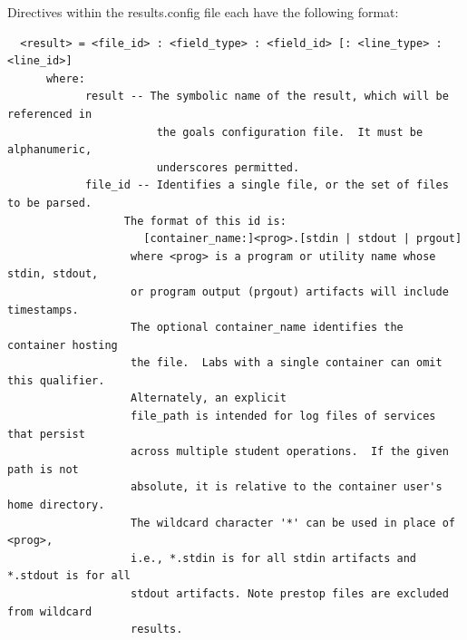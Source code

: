 \documentclass[12pt]{article}
\begin{document}
Directives within the results.config file each have the following format:

\begin{verbatim}
  <result> = <file_id> : <field_type> : <field_id> [: <line_type> : <line_id>]
      where:
            result -- The symbolic name of the result, which will be referenced in 
                       the goals configuration file.  It must be alphanumeric, 
                       underscores permitted.
            file_id -- Identifies a single file, or the set of files to be parsed.  
                  The format of this id is:
                     [container_name:]<prog>.[stdin | stdout | prgout] 
                   where <prog> is a program or utility name whose stdin, stdout,
                   or program output (prgout) artifacts will include timestamps.  
                   The optional container_name identifies the container hosting 
                   the file.  Labs with a single container can omit this qualifier.  
                   Alternately, an explicit 
                   file_path is intended for log files of services that persist 
                   across multiple student operations.  If the given path is not 
                   absolute, it is relative to the container user's home directory. 
                   The wildcard character '*' can be used in place of <prog>,
                   i.e., *.stdin is for all stdin artifacts and *.stdout is for all 
                   stdout artifacts. Note prestop files are excluded from wildcard
                   results. 
                   

\end{verbatim}
\end{document}
